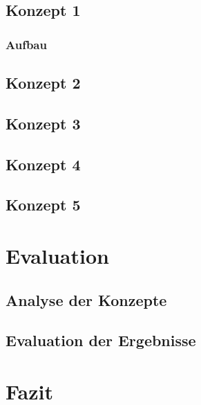 \section{Konzept 1}
\subsection{Aufbau}
\section{Konzept 2}
\section{Konzept 3}
\section{Konzept 4}
\section{Konzept 5}


\chapter{Evaluation}\label{ch:evaluation}

\section{Analyse der Konzepte}
\section{Evaluation der Ergebnisse}

\chapter{Fazit}\label{ch:conclusion}


